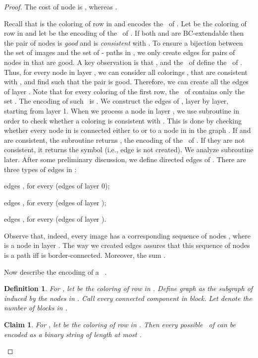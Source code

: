 \documentclass[11pt,english]{article}
\renewenvironment{itemize}[1]{\begin{compactitem}#1}{\end{compactitem}}
\newtheorem{claim}[theorem]{Claim}
\newtheorem{definition}{Definition}[section]
\numberwithin{figure}{section}
\begin{document}
\begin{proof}
The cost of node  is , whereas
.


Recall that  is the coloring of row  in  and  encodes the \cc\ of . Let  be the coloring of row  in  and let  be the encoding of the \cc\ of . If both  and  are BC-extendable then the pair of nodes  is {\em good} and  is {\em consistent} with . To ensure a bijection between the set of  images and the set of - paths in , we only create edges for pairs of nodes in  that are good. A key observation is that , and the \cc\ of  define the \cc\ of . Thus, for every node  in layer , we can consider all colorings , that are consistent with , and find  such that the pair  is good. Therefore, we can create all the edges of layer . Note that for every coloring  of the first row, the \cc\ of  contains only the set . The encoding of such \cc\ is . We construct the edges of , layer by layer, starting from layer 1. When we process a node  in layer , we use subroutine \Compart in order to check whether a coloring  is consistent with . This is done by checking whether every node in  is connected either to  or to a node in  in the graph . If  and  are consistent, the subroutine returns , the encoding of the \cc\ of . If they are not consistent, it returns the  symbol (i.e., edge is not created). We analyze subroutine \Compart later. After some preliminary discussion, we define directed edges of . There are three types of edges in :
\begin{itemize}
\item
edges , for every  (edges of layer 0);
\item
edges , for every  (edges of layer );
\item
edges , for every  (edges of layer ).
\end{itemize}

Observe that, indeed, every  image  has a corresponding sequence of nodes , where  is a node in layer . The way we created edges assures that this sequence of nodes is a path iff  is border-connected. Moreover, the sum .

Now describe the encoding  of a \cc\ .
\begin{definition}\label{def:block}
For , let  be the coloring of row  in . Define graph  as the subgraph of  induced by the nodes in . Call every connected component in  {\em block}. Let  denote the number of blocks in .
\end{definition}
\begin{claim}\label{cl:part}
For , let  be the coloring of row  in . Then every possible \cc\ of  can be encoded as a binary string of length at most .
\end{claim}


\end{proof}
\end{document}
